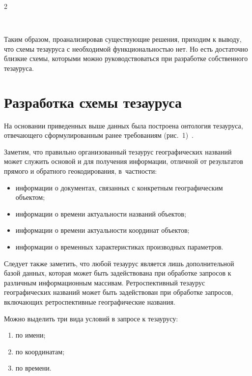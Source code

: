 \begin{multicols}{2}
  \begin{figure}[b]
  \vspace*{1pt}
 \begin{center}
 \mbox{%
 \epsfxsize=115.191mm
 }
 \end{center}
 \vspace*{-9pt}
   \end{figure}
  
  Таким образом, проанализировав сущест\-ву\-ющие решения, приходим к выводу, что схемы 
тезауруса с необходимой функциональностью нет. Но есть достаточно близкие схемы, 
которыми можно руководствоваться при разработке собственного тезауруса. 
  
  \section{Разработка схемы тезауруса}
  
  На основании приведенных выше данных была построена онтология тезауруса, 
отвечающего сформулированным ранее требованиям (рис.~1)~\cite{13-sk}.
  

  
  Заметим, что правильно организованный тезаурус географических названий может 
служить основой и для получения информации, отличной от результатов прямого и 
обратного геокодирования, в~част\-ности:
  \begin{itemize}
\item информации о документах, связанных с конкретным географическим объектом;
\item информации о времени актуальности названий объектов;
\item информации о времени актуальности координат объектов;
\item информации о временных характеристиках производных параметров.
\end{itemize}

  Следует также заметить, что любой тезаурус является лишь дополнительной базой 
данных, которая может быть задействована при обработке запросов к различным 
информационным массивам. Ретроспективный тезаурус географических названий может 
быть задействован при обработке запросов, включающих ретроспективные географические 
названия.
  
  Можно выделить три вида условий в запросе к тезаурусу:
  \begin{enumerate}[(1)]
\item по имени;
\item по координатам;
\item по времени.
\end{enumerate}


\end{multicols}
